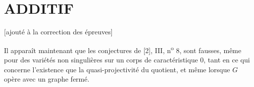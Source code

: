 \section*{ADDITIF}
\begin{center}
{\small [ajouté à la correction des épreuves]}
\end{center}

Il apparaît maintenant que les conjectures de [2], III,
n\textsuperscript{o} 8, sont fausses, même pour des variétés non singulières sur
un corps de caractéristique 0, tant en ce qui concerne l'existence que la
quasi-projectivité du quotient, et même lorsque $G$ opère avec un graphe fermé.

\par\smallskip
\begingroup\footnotesize
\endgroup
